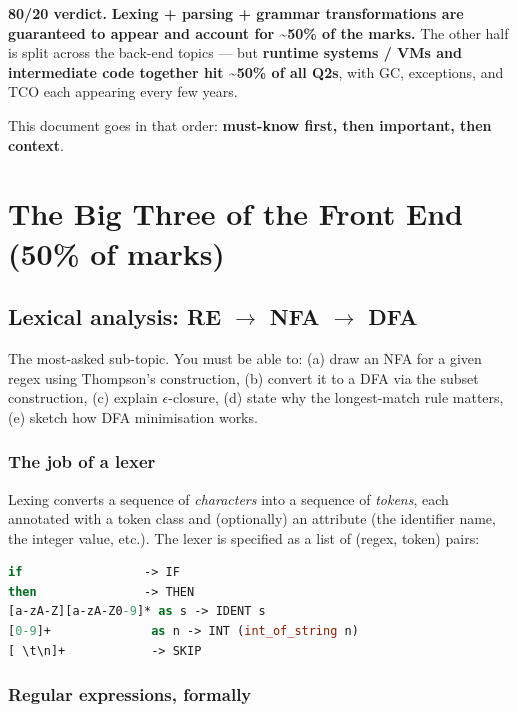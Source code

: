 \documentclass[11pt,a4paper]{article}
\begin{document}
\textbf{80/20 verdict.} \textbf{Lexing + parsing + grammar transformations are guaranteed to appear and account for \textasciitilde50\% of the marks.} The other half is split across the back-end topics --- but \textbf{runtime systems / VMs and intermediate code together hit \textasciitilde50\% of all Q2s}, with GC, exceptions, and TCO each appearing every few years.

This document goes in that order: \textbf{must-know first, then important, then context}.

\hrulefill

\section{The Big Three of the Front End (50\% of marks)}

\subsection{Lexical analysis: RE $\to$ NFA $\to$ DFA}

\begin{must}
The most-asked sub-topic. You must be able to: (a) draw an NFA for a given regex using Thompson's construction, (b) convert it to a DFA via the subset construction, (c) explain $\epsilon$-closure, (d) state why the longest-match rule matters, (e) sketch how DFA minimisation works.
\end{must}

\subsubsection*{The job of a lexer}

Lexing converts a sequence of \emph{characters} into a sequence of \emph{tokens}, each annotated with a token class and (optionally) an attribute (the identifier name, the integer value, etc.). The lexer is specified as a list of (regex, token) pairs:

\begin{lstlisting}[language=ocaml]
if                 -> IF
then               -> THEN
[a-zA-Z][a-zA-Z0-9]* as s -> IDENT s
[0-9]+              as n -> INT (int_of_string n)
[ \t\n]+            -> SKIP
\end{lstlisting}

\subsubsection*{Regular expressions, formally}
\end{document}
